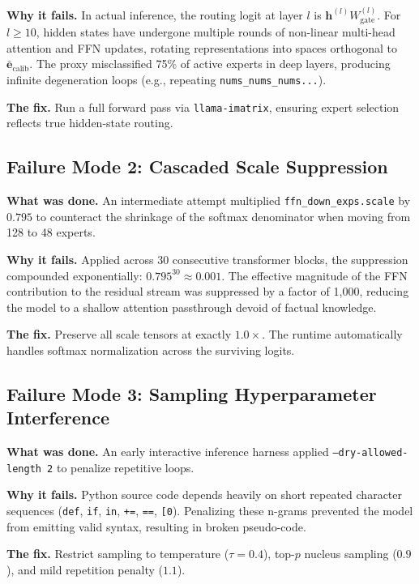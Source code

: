 \documentclass[final]{article}
\begin{document}
\textbf{Why it fails.} In actual inference, the routing logit at layer $l$ is $\mathbf{h}^{(l)} W_\text{gate}^{(l)}$. For $l \ge 10$, hidden states have undergone multiple rounds of non-linear multi-head attention and FFN updates, rotating representations into spaces orthogonal to $\bar{\mathbf{e}}_\text{calib}$. The proxy misclassified 75\% of active experts in deep layers, producing infinite degeneration loops (e.g., repeating \texttt{nums\_nums\_nums...}).

\textbf{The fix.} Run a full forward pass via \texttt{llama-imatrix}, ensuring expert selection reflects true hidden-state routing.

\subsection{Failure Mode 2: Cascaded Scale Suppression}

\textbf{What was done.} An intermediate attempt multiplied \texttt{ffn\_down\_exps.scale} by $0.795$ to counteract the shrinkage of the softmax denominator when moving from 128 to 48 experts.

\textbf{Why it fails.} Applied across 30 consecutive transformer blocks, the suppression compounded exponentially: $0.795^{30} \approx 0.001$. The effective magnitude of the FFN contribution to the residual stream was suppressed by a factor of 1,000, reducing the model to a shallow attention passthrough devoid of factual knowledge.

\textbf{The fix.} Preserve all scale tensors at exactly $1.0\times$. The runtime automatically handles softmax normalization across the surviving logits.

\subsection{Failure Mode 3: Sampling Hyperparameter Interference}

\textbf{What was done.} An early interactive inference harness applied \texttt{--dry-allowed-length 2} to penalize repetitive loops.

\textbf{Why it fails.} Python source code depends heavily on short repeated character sequences (\texttt{def}, \texttt{if}, \texttt{in}, \texttt{+=}, \texttt{==}, \texttt{[0}). Penalizing these n-grams prevented the model from emitting valid syntax, resulting in broken pseudo-code.

\textbf{The fix.} Restrict sampling to temperature ($\tau=0.4$), top-$p$ nucleus sampling ($0.9$), and mild repetition penalty ($1.1$).
\end{document}
